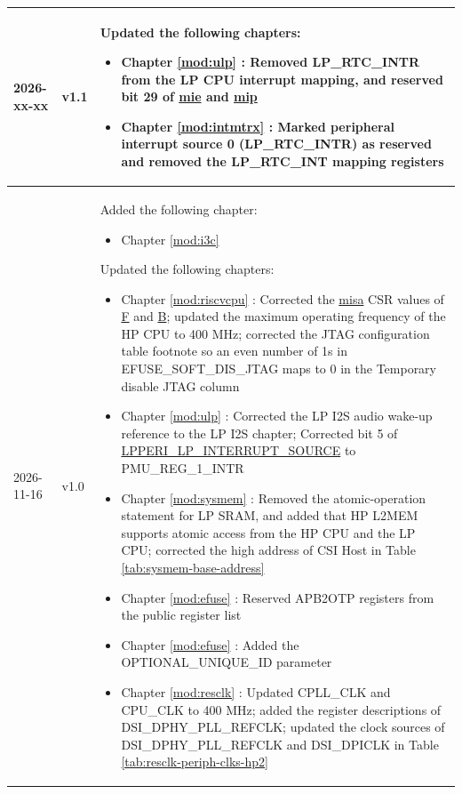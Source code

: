 \begin{longtable}[l]{ | m{2cm} | m{1.5cm} | m{12cm} | }
    2026-xx-xx & v1.1 &
    Updated the following chapters:
    \begin{itemize}
        \item Chapter \ref{mod:ulp} \textit{\nameref{mod:ulp}}: Removed LP\_RTC\_INTR from the LP CPU interrupt mapping, and reserved bit 29 of \hyperref[regdesc:LPMIE]{mie} and \hyperref[regdesc:LPMIP]{mip}
        \item Chapter \ref{mod:intmtrx} \textit{\nameref{mod:intmtrx}}: Marked peripheral interrupt source 0 (LP\_RTC\_INTR) as reserved and removed the LP\_RTC\_INT mapping registers
    \end{itemize}
    \\\hline
    2026-11-16 & v1.0 &
    Added the following chapter:
    \begin{itemize}
        \item Chapter \ref{mod:i3c} \textit{\nameref{mod:i3c}}
    \end{itemize}
    Updated the following chapters:
    \begin{itemize}
        \item Chapter \ref{mod:riscvcpu} \textit{\nameref{mod:riscvcpu}}: Corrected the \hyperref[regdesc:MISA]{misa} CSR values of \hyperref[fielddesc:MISAF]{F} and \hyperref[fielddesc:MISAB]{B}; updated the maximum operating frequency of the HP CPU to 400 MHz; corrected the JTAG configuration table footnote so an even number of 1s in EFUSE\_SOFT\_DIS\_JTAG maps to 0 in the Temporary disable JTAG column %
        \item Chapter \ref{mod:ulp} \textit{\nameref{mod:ulp}}: Corrected the LP I2S audio wake-up reference to the LP I2S chapter; Corrected bit 5 of \hyperref[fielddesc:LPPERILPINTERRUPTSOURCE]{LPPERI\_LP\_INTERRUPT\_SOURCE} to PMU\_REG\_1\_INTR %
        \item Chapter \ref{mod:sysmem} \textit{\nameref{mod:sysmem}}: Removed the atomic-operation statement for LP SRAM, and added that HP L2MEM supports atomic access from the HP CPU and the LP CPU; corrected the high address of CSI Host in Table \ref{tab:sysmem-base-address} \textit{\nameref{tab:sysmem-base-address}} %
        \item Chapter \ref{mod:efuse} \textit{\nameref{mod:efuse}}: Reserved APB2OTP registers from the public register list %
        \item Chapter \ref{mod:efuse} \textit{\nameref{mod:efuse}}: Added the OPTIONAL\_UNIQUE\_ID parameter %
        \item Chapter \ref{mod:resclk} \textit{\nameref{mod:resclk}}: Updated CPLL\_CLK and CPU\_CLK to 400 MHz; added the register descriptions of DSI\_DPHY\_PLL\_REFCLK; updated the clock sources of DSI\_DPHY\_PLL\_REFCLK and DSI\_DPICLK in Table \ref{tab:resclk-periph-clks-hp2} \textit{\nameref{tab:resclk-periph-clks-hp2}} %

\end{itemize}
\end{longtable}
